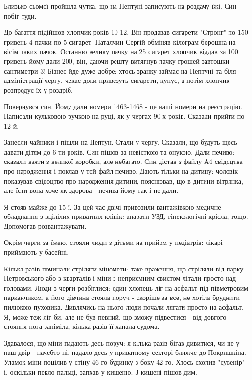 Близько сьомої пройшла чутка, що на Нептуні записують на роздачу їжі. Син побіг
туди. 

До багаття підійшов хлопчик років 10-12. Він продавав сигарети "Стронг" по 150
гривень 4 пачки по 5 сигарет. Наталчин Сергій обміняв кілограм борошна на вісім
таких пачок. Останню велику пачку на 25 сигарет хлопчик віддав за 100 гривень
йому дали 200, він, даючи решту витягнув пачку грошей завтошки сантиметри 3!
Бізнес йде дуже добре: хтось зранку займає на Нептуні та біля адміністрації
чергу, чекає доки привезуть сигарети, купує, а потім хлопчик розпродує їх у
роздріб.


Повернувся син. Йому дали номери 1463-1468 - це наші номери на реєстрацію.
Написали кульковою ручкою на руці, як у чергах 90-х років. Сказали прийти по
12-й.

Занесли чайники і пішли на Нептун. Стали у чергу. Сказали, що будуть щось
давати дітям до 6-ти років. Син пішов за невісткою та онукою. Дали печиво:
сказали взяти з великої коробки, але небагато. Син дістав з файлу А4 свідоцтва
про народження і поклав у той файл печиво. Дають тільки на дитину: чоловік
показував свідоцтво про народження дитини, пояснював, що в дитини вітрянка, але
їсти вона хоче як здорова - печива йому так і не дали.

Я стояв майже до 15-ї. За цей час двічі привозили вантажівкою медичне
обладнання з вцілілих приватних клінік: апарати УЗД, гінекологічні крісла,
тощо. Допомогав розвантажувати. 

Окрім черги за їжею, стояли люди з дітьми на прийом у педіатрів: лікарі
приймають у басейні. 


Кілька разів починали стріляти міномети: таке враження, що стріляли від парку
Петровського або з кварталів і міни з неприємним свистом літали просто над
головами. Люди з черги розбіглися: один хлопець ліг на асфальт під півметровим
парканчиком, а його дівчина стояла поруч - скоріше за все, не хотіла бруднити
пилюкою пуховика.  Дивлячись на нього люди почали лягати просто на асфальт. Я,
може теж ліг би, але не був певний, що зможу підвестися - від довгого стояння
нога заніміла, кілька разів її хапала судома. 

Здавалося, що міни падають десь поруч: я кілька разів бігав дивитися, чи не у
наш двір - начебто ні, падало десь у приватному секторі ближче до Покришкіна.
Уламок міни поцілив у стіну 46-го будинку з боку 42-го. Хтось схопив "сувенір"
і, оскільки пекло пальці, запхав у кишеню. З кишені пішов дим.

